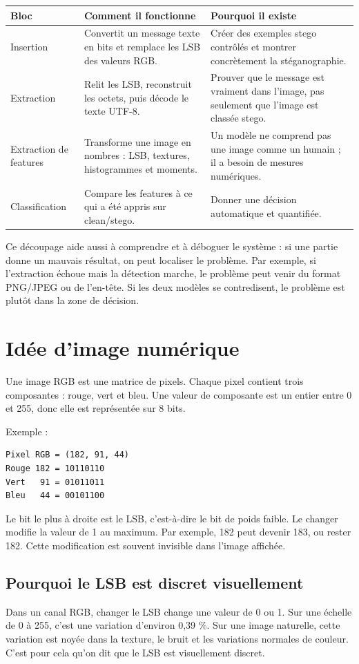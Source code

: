 \documentclass[11pt,a4paper]{article}
\begin{document}
\begin{longtable}{p{3.4cm}p{5.2cm}p{5.2cm}}
\toprule
Bloc & Comment il fonctionne & Pourquoi il existe \\
\midrule
Insertion & Convertit un message texte en bits et remplace les LSB des valeurs RGB. & Créer des exemples stego contrôlés et montrer concrètement la stéganographie. \\
Extraction & Relit les LSB, reconstruit les octets, puis décode le texte UTF-8. & Prouver que le message est vraiment dans l'image, pas seulement que l'image est classée stego. \\
Extraction de features & Transforme une image en nombres : LSB, textures, histogrammes et moments. & Un modèle ne comprend pas une image comme un humain ; il a besoin de mesures numériques. \\
Classification & Compare les features à ce qui a été appris sur clean/stego. & Donner une décision automatique et quantifiée. \\
\bottomrule
\end{longtable}

Ce découpage aide aussi à comprendre et à déboguer le système : si une partie donne un mauvais résultat, on peut localiser le problème. Par exemple, si l'extraction échoue mais la détection marche, le problème peut venir du format PNG/JPEG ou de l'en-tête. Si les deux modèles se contredisent, le problème est plutôt dans la zone de décision.

\section{Idée d'image numérique}
Une image RGB est une matrice de pixels. Chaque pixel contient trois composantes : rouge, vert et bleu. Une valeur de composante est un entier entre 0 et 255, donc elle est représentée sur 8 bits.

Exemple :
\begin{lstlisting}
Pixel RGB = (182, 91, 44)
Rouge 182 = 10110110
Vert   91 = 01011011
Bleu   44 = 00101100
\end{lstlisting}

Le bit le plus à droite est le LSB, c'est-à-dire le bit de poids faible. Le changer modifie la valeur de 1 au maximum. Par exemple, 182 peut devenir 183, ou rester 182. Cette modification est souvent invisible dans l'image affichée.

\subsection*{Pourquoi le LSB est discret visuellement}
Dans un canal RGB, changer le LSB change une valeur de 0 ou 1. Sur une échelle de 0 à 255, c'est une variation d'environ 0,39 \%. Sur une image naturelle, cette variation est noyée dans la texture, le bruit et les variations normales de couleur. C'est pour cela qu'on dit que le LSB est visuellement discret.
\end{document}
